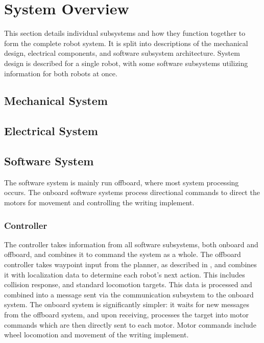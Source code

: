 \section{System Overview}
\label{sec:system_overview}

This section details individual subsystems and how they function together to form the complete robot system. It is split into descriptions of the mechanical design, electrical components, and software subsystem architecture. System design is described for a single robot, with some software subsystems utilizing information for both robots at once.

\subsection{Mechanical System}
\label{sec:mechanical}

\subsection{Electrical System}
\label{sec:electrical}

\subsection{Software System}
\label{sec:software}
The software system is mainly run offboard, where most system processing occurs. The onboard software systems process directional commands to direct the motors for movement and controlling the writing implement.

\subsubsection{Controller}
\label{sec:sw_controller}
The controller takes information from all software subsystems, both onboard and offboard, and combines it to command the system as a whole. The offboard controller takes waypoint input from the planner, as described in , and combines it with localization data to determine each robot's next action. This includes collision response, and standard locomotion targets. This data is processed and combined into a message sent via the communication subsystem to the onboard system. The onboard system is significantly simpler: it waits for new messages from the offboard system, and upon receiving, processes the target into motor commands which are then directly sent to each motor. Motor commands include wheel locomotion and movement of the writing implement.

